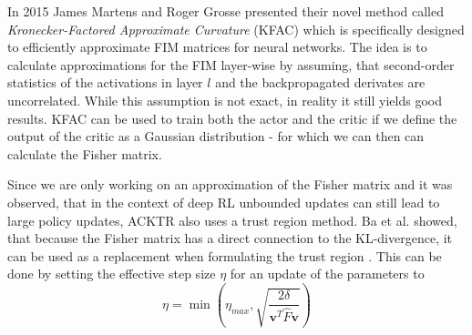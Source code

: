 In 2015 James Martens and Roger Grosse presented their novel method called \textit{Kronecker-Factored Approximate Curvature} (KFAC) \cite{martens2015optimizing} which is specifically designed to efficiently approximate FIM matrices for neural networks. The idea is to calculate approximations for the FIM layer-wise by assuming, that second-order statistics of the activations in layer $l$ and the backpropagated derivates are uncorrelated. While this assumption is not exact, in reality it still yields good results. KFAC can be used to train both the actor and the critic if we define the output of the critic as a Gaussian distribution - for which we can then can calculate the Fisher matrix. 



Since we are only working on an approximation of the Fisher matrix and it was observed, that in the context of deep RL unbounded updates can still lead to large policy updates, ACKTR also uses a trust region method. Ba et al. showed, that because the Fisher matrix has a direct connection to the KL-divergence, it can be used as a replacement when formulating the trust region \cite{ba2016distributed}. This can be done by setting the effective step size $\eta$ for an update of the parameters to 
\[\eta = \min\left(\eta_{max}, \sqrt{\frac{2\delta}{\mathbf{v}^T\hat{F}\mathbf{v}}}\right)\]

